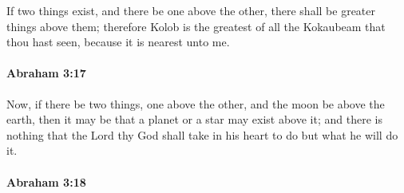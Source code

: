 			If two things exist, and there be one above the other, there shall be greater things above them; therefore Kolob is the greatest of all the Kokaubeam that thou hast seen, because it is nearest unto me.


		\paragraph{Abraham 3:17} %
			\label{ABRAHAM-3-17}

			Now, if there be two things, one above the other, and the moon be above the earth, then it may be that a planet or a star may exist above it; and there is nothing that the Lord thy God shall take in his heart to do but what he will do it.


		\paragraph{Abraham 3:18} %
			\label{ABRAHAM-3-18}


